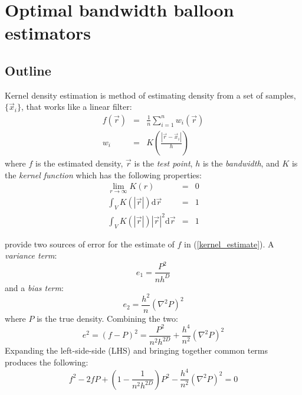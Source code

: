 


%

%

\section{Optimal bandwidth balloon estimators}

\subsection{Outline}

Kernel density estimation is method of estimating density from a set of samples,
$\lbrace \vec x_i \rbrace$, that works like a linear filter:
\begin{eqnarray}
f(\vec r) & = & \frac{1}{n} \sum_{i=1}^{n} w_i(\vec r) \label{kernel_estimate}\\
w_i & = & K\left(\frac{|\vec r - \vec x_i|}{h}\right)
\end{eqnarray}
where $f$ is the estimated density, $\vec r$ is the {\it test point},
$h$ is the {\it bandwidth},
and $K$ is the {\it kernel function} which has the following properties:
\begin{eqnarray}
\lim_{r \rightarrow \infty} K(r) & = & 0 \\
\int_V K(|\vec r|) \mathrm d \vec r & = & 1 \\
\int_V K(|\vec r|) |\vec r|^2 \mathrm d \vec r & = & 1 
\end{eqnarray}

\citet{Terrell_Scott1992} provide two sources of error for the estimate
of $f$ in (\ref{kernel_estimate}). A {\it variance term}:
\begin{equation}
e_1 = \frac{P^2}{n h^D}
\end{equation}
and a {\it bias term}:
\begin{equation}
e_2 = \frac{h^2}{n} \left ( \nabla^2 P \right )^2
\end{equation}
where $P$ is the true density.
Combining the two:
\begin{equation}
e^2 = (f - P)^2 = \frac{P^2}{n^2 h^{2 D}} + \frac{h^4}{n^2} \left ( \nabla^2 P \right )^2
\end{equation}
Expanding the left-side-side (LHS) and bringing together common terms produces 
the following:
\begin{equation}
f^2 - 2 f P + \left (1 - \frac{1}{n^2 h^{2 D}} \right ) P^2 - \frac{h^4}{n^2} 
	\left ( \nabla^2 P \right )^2 = 0
\label{basic_equation}
\end{equation}

